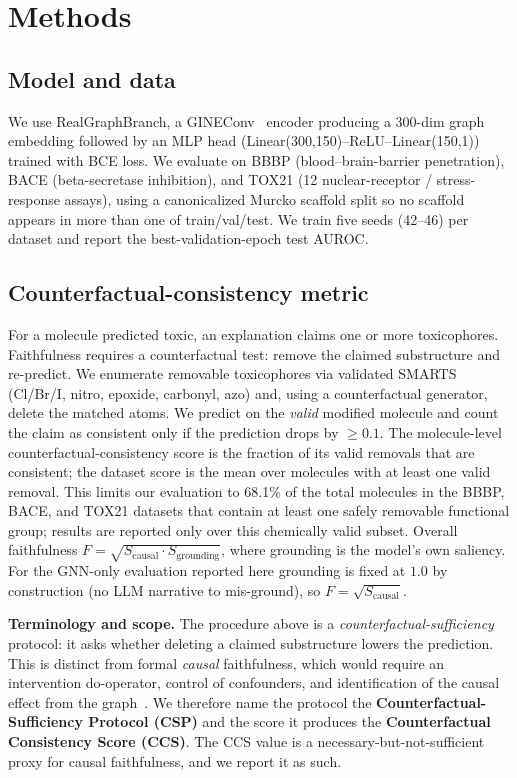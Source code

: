 \documentclass[conference]{IEEEtran}
\begin{document}
\section{Methods}
\subsection{Model and data}
We use RealGraphBranch, a GINEConv~\cite{xu2019powerful} encoder producing a 300-dim graph embedding followed by an MLP head (Linear(300,150)--ReLU--Linear(150,1)) trained with BCE loss. We evaluate on BBBP (blood--brain-barrier penetration), BACE (beta-secretase inhibition), and TOX21 (12 nuclear-receptor / stress-response assays), using a canonicalized Murcko scaffold split so no scaffold appears in more than one of train/val/test. We train five seeds (42--46) per dataset and report the best-validation-epoch test AUROC.

\subsection{Counterfactual-consistency metric}
\label{sec:metric}
For a molecule predicted toxic, an explanation claims one or more toxicophores. Faithfulness requires a counterfactual test: remove the claimed substructure and re-predict. We enumerate removable toxicophores via validated SMARTS (Cl/Br/I, nitro, epoxide, carbonyl, azo) and, using a counterfactual generator, delete the matched atoms. We predict on the \emph{valid} modified molecule and count the claim as consistent only if the prediction drops by $\geq 0.1$. The molecule-level counterfactual-consistency score is the fraction of its valid removals that are consistent; the dataset score is the mean over molecules with at least one valid removal. This limits our evaluation to 68.1\% of the total molecules in the BBBP, BACE, and TOX21 datasets that contain at least one safely removable functional group; results are reported only over this chemically valid subset. Overall faithfulness $F = \sqrt{S_{\text{causal}} \cdot S_{\text{grounding}}}$, where grounding is the model's own saliency. For the GNN-only evaluation reported here grounding is fixed at $1.0$ by construction (no LLM narrative to mis-ground), so $F = \sqrt{S_{\text{causal}}}$.

\textbf{Terminology and scope.} The procedure above is a \emph{counterfactual-sufficiency} protocol: it asks whether deleting a claimed substructure lowers the prediction. This is distinct from formal \emph{causal} faithfulness, which would require an intervention do-operator, control of confounders, and identification of the causal effect from the graph~\cite{pearl2009causality}. We therefore name the protocol the \textbf{Counterfactual-Sufficiency Protocol (CSP)} and the score it produces the \textbf{Counterfactual Consistency Score (CCS)}. The CCS value is a necessary-but-not-sufficient proxy for causal faithfulness, and we report it as such.
\end{document}
